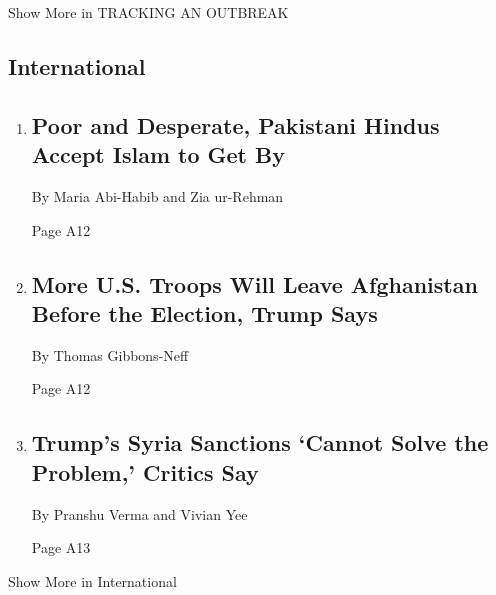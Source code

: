 Show More in TRACKING AN OUTBREAK

\hypertarget{international}{%
\subsection{International}\label{international}}

\begin{enumerate}
\def\labelenumi{\arabic{enumi}.}
\item
  \href{/2020/08/04/world/asia/pakistan-hindu-conversion.html}{}

  \hypertarget{poor-and-desperate-pakistani-hindus-accept-islam-to-get-by-1}{%
  \subsection{Poor and Desperate, Pakistani Hindus Accept Islam to Get
  By}\label{poor-and-desperate-pakistani-hindus-accept-islam-to-get-by-1}}

  By Maria Abi-Habib and Zia ur-Rehman

  Page A12
\item
  \href{/2020/08/04/world/asia/us-troops-afghanistan.html}{}

  \hypertarget{more-us-troops-will-leave-afghanistan-before-the-election-trump-says}{%
  \subsection{More U.S. Troops Will Leave Afghanistan Before the
  Election, Trump
  Says}\label{more-us-troops-will-leave-afghanistan-before-the-election-trump-says}}

  By Thomas Gibbons-Neff

  Page A12
\item
  \href{/2020/08/04/world/middleeast/trump-assad-syria-sanctions.html}{}

  \hypertarget{trumps-syria-sanctions-cannot-solve-the-problem-critics-say}{%
  \subsection{Trump's Syria Sanctions `Cannot Solve the Problem,'
  Critics
  Say}\label{trumps-syria-sanctions-cannot-solve-the-problem-critics-say}}

  By Pranshu Verma and Vivian Yee

  Page A13
\end{enumerate}

Show More in International

